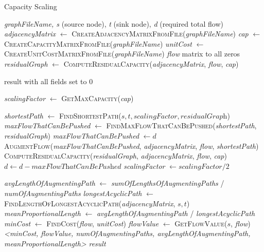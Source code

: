 \documentclass{article}
\begin{document}
\begin{algorithm}[H]
\caption{\textcolor{keywordcolor}{Capacity Scaling}}
\begin{algorithmic}[1]
\State {} \textit{graphFileName, s} (source node), \textit{t} (sink node), \textit{d} (required total flow)
\State \textit{adjacencyMatrix} $\gets$ \textcolor{identifiercolor}{\textsc{CreateAdjacencyMatrixFromFile}}(\textit{graphFileName})
\State \textit{cap} $\gets$ \textcolor{identifiercolor}{\textsc{CreateCapacityMatrixFromFile}}(\textit{graphFileName})
\State \textit{unitCost} $\gets$ \textcolor{identifiercolor}{\textsc{CreateUnitCostMatrixFromFile}}(\textit{graphFileName})
\State {} \textit{flow} matrix to all zeros
\State \textit{residualGraph} $\gets$ \textcolor{identifiercolor}{\textsc{ComputeResidualCapacity}}(\textit{adjacencyMatrix}, \textit{flow}, \textit{cap})

    \State \Return result with all fields set to 0
\EndIf

\State \textit{scalingFactor} $\gets$ \textcolor{identifiercolor}{\textsc{GetMaxCapacity}}(\textit{cap})

        \State \textit{shortestPath} $\gets$ \textcolor{identifiercolor}{\textsc{FindShortestPath}}($s, t, \textit{scalingFactor}, \textit{residualGraph}$)
        \State \textit{maxFlowThatCanBePushed} $\gets$ \textcolor{identifiercolor}{\textsc{FindMaxFlowThatCanBePushed}}(\textit{shortestPath}, \textit{residualGraph})
            \State \textit{maxFlowThatCanBePushed} $\gets d$
        \EndIf
        \State \textcolor{identifiercolor}{\textsc{AugmentFlow}}(\textit{maxFlowThatCanBePushed}, \textit{adjacencyMatrix}, \textit{flow}, \textit{shortestPath})
        \State \textcolor{identifiercolor}{\textsc{ComputeResidualCapacity}}(\textit{residualGraph}, \textit{adjacencyMatrix}, \textit{flow}, \textit{cap})
        \State $d \gets d - \textit{maxFlowThatCanBePushed}$
    \EndWhile
    \State \textit{scalingFactor} $\gets \textit{scalingFactor} / 2$
\EndWhile

\State \textit{avgLengthOfAugmentingPath} $\gets$ \textit{sumOfLengthsOfAugmentingPaths} / \textit{numOfAugmentingPaths}
\State \textit{longestAcyclicPath} $\gets$ \textcolor{identifiercolor}{\textsc{FindLengthOfLongestAcyclicPath}}(\textit{adjacencyMatrix}, $s, t$)
\State \textit{meanProportionalLength} $\gets$ \textit{avgLengthOfAugmentingPath} / \textit{longestAcyclicPath}
\State \textit{minCost} $\gets$ \textcolor{identifiercolor}{\textsc{FindCost}}(\textit{flow}, \textit{unitCost})
\State \textit{flowValue} $\gets$ \textcolor{identifiercolor}{\textsc{GetFlowValue}}($s$, \textit{flow})
\State {} \textit{<minCost, flowValue, numOfAugmentingPaths, avgLengthOfAugmentingPath, meanProportionalLength>}
\State \Return \textit{result}
\end{algorithmic}
\end{algorithm}
\end{document}
